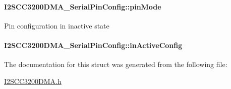 \paragraph[{pin\+Mode}]{ I2\+S\+C\+C3200\+D\+M\+A\+\_\+\+Serial\+Pin\+Config\+::pin\+Mode}\label{struct_i2_s_c_c3200_d_m_a___serial_pin_config_a46db8b0004dfc5fda168e243f5f583f7}
Pin configuration in inactive state 
\paragraph[{in\+Active\+Config}]{ I2\+S\+C\+C3200\+D\+M\+A\+\_\+\+Serial\+Pin\+Config\+::in\+Active\+Config}\label{struct_i2_s_c_c3200_d_m_a___serial_pin_config_ad033e14336b2398851bccb7f738dcbf1}


The documentation for this struct was generated from the following file\+:\begin{DoxyCompactItemize}
\item 
\hyperlink{_i2_s_c_c3200_d_m_a_8h}{I2\+S\+C\+C3200\+D\+M\+A.\+h}\end{DoxyCompactItemize}
